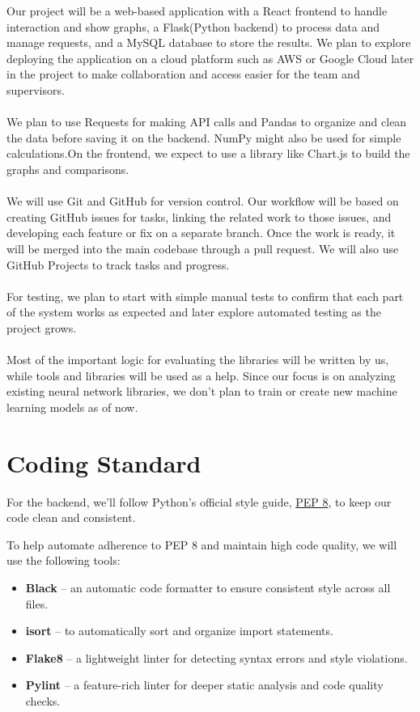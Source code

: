 \documentclass{article}
\begin{document}
Our project will be a web-based application with a React frontend to handle interaction and show graphs, a Flask(Python backend) to process data and manage requests, and a MySQL database to store the results. We plan to explore deploying the application on a cloud platform such as AWS or Google Cloud later in the project to make collaboration and access easier for the team and supervisors.\\ \\
We plan to use Requests for making API calls and Pandas to organize and clean the data before saving it on the backend. NumPy might also be used for simple calculations.On the frontend, we expect to use a library like Chart.js to build the graphs and comparisons.\\ \\
We will use Git and GitHub for version control. Our workflow will be based on creating GitHub issues for tasks, linking the related work to those issues, and developing each feature or fix on a separate branch. Once the work is ready, it will be merged into the main codebase through a pull request. We will also use GitHub Projects to track tasks and progress.\\ \\
For testing, we plan to start with simple manual tests to confirm that each part of the system works as expected and later explore automated testing as the project grows.\\ \\
Most of the important logic for evaluating the libraries will be written by us, while tools and libraries will be used as a help. Since our focus is on analyzing existing neural network libraries, we don’t plan to train or create new machine learning models as of now.
\section{Coding Standard}

For the backend, we’ll follow Python’s official style guide, \href{https://peps.python.org/pep-0008/}{PEP 8}, to keep our code clean and consistent.

To help automate adherence to PEP 8 and maintain high code quality, we will use the following tools:
\begin{itemize}
  \item \textbf{Black} – an automatic code formatter to ensure consistent style across all files.
  \item \textbf{isort} – to automatically sort and organize import statements.
  \item \textbf{Flake8} – a lightweight linter for detecting syntax errors and style violations.
  \item \textbf{Pylint} – a feature-rich linter for deeper static analysis and code quality checks.
\end{itemize}
\end{document}

